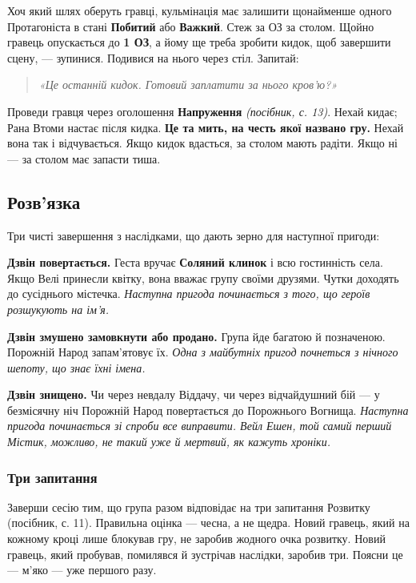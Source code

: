 \documentclass[10pt,a4paper]{article}
\begin{document}
Хоч який шлях оберуть гравці, кульмінація має залишити щонайменше одного Протагоніста в стані \textbf{Побитий} або \textbf{Важкий}. Стеж за ОЗ за столом. Щойно гравець опускається до \textbf{1 ОЗ}, а йому ще треба зробити кидок, щоб завершити сцену, --- зупинися. Подивися на нього через стіл. Запитай:

\begin{quote}
\emph{«Це останній кидок. Готовий заплатити за нього кров’ю?»}
\end{quote}

Проведи гравця через оголошення \textbf{Напруження} \emph{(посібник, с. 13)}. Нехай кидає; Рана Втоми настає після кидка. \textbf{Це та мить, на честь якої названо гру.} Нехай вона так і відчувається. Якщо кидок вдасться, за столом мають радіти. Якщо ні --- за столом має запасти тиша.

\par\vspace{3pt}

\subsection{Розв’язка}\label{ux440ux43eux437ux432ux44fux437ux43aux430}

Три чисті завершення з наслідками, що дають зерно для наступної пригоди:

\textbf{Дзвін повертається.} Геста вручає \textbf{Соляний клинок} і всю гостинність села. Якщо Велі принесли квітку, вона вважає групу своїми друзями. Чутки доходять до сусіднього містечка. \emph{Наступна пригода починається з того, що героїв розшукують на ім’я.}

\textbf{Дзвін змушено замовкнути або продано.} Група йде багатою й позначеною. Порожній Народ запам’ятовує їх. \emph{Одна з майбутніх пригод почнеться з нічного шепоту, що знає їхні імена.}

\textbf{Дзвін знищено.} Чи через невдалу Віддачу, чи через відчайдушний бій --- у безмісячну ніч Порожній Народ повертається до Порожнього Вогнища. \emph{Наступна пригода починається зі спроби все виправити. Вейл Ешен, той самий перший Містик, можливо, не такий уже й мертвий, як кажуть хроніки.}

\subsubsection{Три запитання}\label{ux442ux440ux438-ux437ux430ux43fux438ux442ux430ux43dux43dux44f}

Заверши сесію тим, що група разом відповідає на три запитання Розвитку (посібник, с. 11). Правильна оцінка --- чесна, а не щедра. Новий гравець, який на кожному кроці лише блокував гру, не заробив жодного очка розвитку. Новий гравець, який пробував, помилявся й зустрічав наслідки, заробив три. Поясни це --- м’яко --- уже першого разу.
\end{document}
